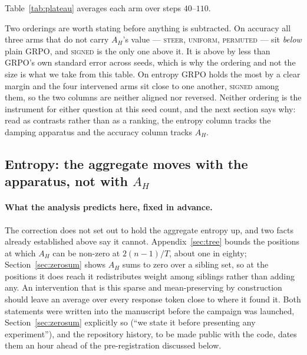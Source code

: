 \documentclass[11pt]{article}
\newcommand{\AH}{A_{H}}
\begin{document}
Table~\ref{tab:plateau} averages each arm over steps $40$--$110$.


Two orderings are worth stating before anything is subtracted. On accuracy all
three arms that do not carry $\AH$'s value --- \textsc{steer}, \textsc{uniform},
\textsc{permuted} --- sit \emph{below} plain GRPO, and \textsc{signed} is the only one
above it. It is above by less than GRPO's own standard error across seeds, which is
why the ordering and not the size is what we take from this table. On entropy GRPO
holds the most by a clear margin and the four intervened arms sit close to one
another, \textsc{signed} among them, so the two columns are neither aligned nor
reversed. Neither ordering is the instrument for either question at this seed count,
and the next section says why: read as contrasts rather than as a ranking, the
entropy column tracks the damping apparatus and the accuracy column tracks $\AH$.

\subsection{Entropy: the aggregate moves with the apparatus, not with $\AH$}
\label{sec:res:entropy-app}


\paragraph{What the analysis predicts here, fixed in advance.} The correction does not
set out to hold the aggregate entropy up, and two facts already established above
say it cannot. Appendix~\ref{sec:tree} bounds the positions at which $\AH$ can be
non-zero at $2(n-1)/T$, about one in eighty; Section~\ref{sec:zerosum} shows $\AH$
sums to zero over a sibling set, so at the positions it does reach it redistributes
weight among siblings rather than adding any. An intervention that is this sparse
and mean-preserving by construction should leave an average over every response
token close to where it found it. Both statements were written into the manuscript
before the campaign was launched, Section~\ref{sec:zerosum} explicitly so
(``we state it before presenting any experiment''), and the repository history, to
be made public with the code, dates them an hour ahead of the pre-registration
discussed below.
\end{document}
